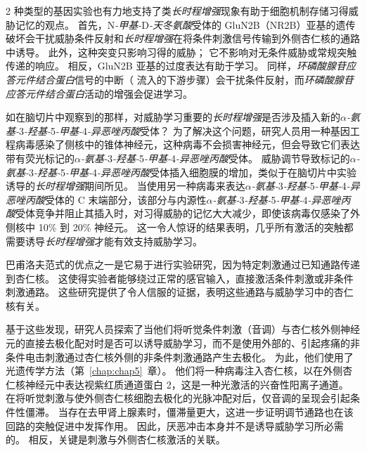 2 种类型的基因实验也有力地支持了类\textit{长时程增强}现象有助于细胞机制存储习得威胁记忆的观点。
首先，N\textit{-甲基-}D\textit{-天冬氨酸}受体的 GluN2B（NR2B）亚基的遗传破坏会干扰威胁条件反射和\textit{长时程增强}在将条件刺激信号传输到外侧杏仁核的通路中诱导。
此外，这种突变只影响习得的威胁；
它不影响对无条件威胁或常规突触传递的响应。
相反，GluN2B 亚基的过度表达有助于学习。
同样，\textit{环磷酸腺苷应答元件结合蛋白}信号的中断（ 流入的下游步骤）会干扰条件反射，而\textit{环磷酸腺苷应答元件结合蛋白}活动的增强会促进学习。


如在脑切片中观察到的那样，对威胁学习重要的\textit{长时程增强}是否涉及插入新的\textit{$\alpha$-氨基-}3\textit{-羟基-}5\textit{-甲基-}4\textit{-异恶唑丙酸}受体？
为了解决这个问题，研究人员用一种基因工程病毒感染了侧核中的锥体神经元，这种病毒不会损害神经元，但会导致它们表达带有荧光标记的\textit{$\alpha$-氨基-}3\textit{-羟基-}5\textit{-甲基-}4\textit{-异恶唑丙酸}受体。
威胁调节导致标记的\textit{$\alpha$-氨基-}3\textit{-羟基-}5\textit{-甲基-}4\textit{-异恶唑丙酸}受体插入细胞膜的增加，类似于在脑切片中实验诱导的\textit{长时程增强}期间所见。
当使用另一种病毒来表达\textit{$\alpha$-氨基-}3\textit{-羟基-}5\textit{-甲基-}4\textit{-异恶唑丙酸}受体的 C 末端部分，该部分与内源性\textit{$\alpha$-氨基-}3\textit{-羟基-}5\textit{-甲基-}4\textit{-异恶唑丙酸}受体竞争并阻止其插入时，对习得威胁的记忆大大减少，即使该病毒仅感染了外侧核中 10\% 到 20\% 神经元。
这一令人惊讶的结果表明，几乎所有激活的突触都需要诱导\textit{长时程增强}才能有效支持威胁学习。


巴甫洛夫范式的优点之一是它易于进行实验研究，因为特定刺激通过已知通路传递到杏仁核。
这使得实验者能够绕过正常的感官输入，直接激活条件刺激或非条件刺激通路。
这些研究提供了令人信服的证据，表明这些通路与威胁学习中的杏仁核有关。


基于这些发现，研究人员探索了当他们将听觉条件刺激（音调）与杏仁核外侧神经元的直接去极化配对时是否可以诱导威胁学习，而不是使用外部的、引起疼痛的非条件电击刺激通过杏仁核外侧的非条件刺激通路产生去极化。
为此，他们使用了光遗传学方法（第~\ref{chap:chap5}~章）。
他们将一种病毒注入杏仁核，以在外侧杏仁核神经元中表达视紫红质通道蛋白 2，这是一种光激活的兴奋性阳离子通道。
在将听觉刺激与使外侧杏仁核细胞去极化的光脉冲配对后，仅音调的呈现会引起条件性僵滞。
当存在去甲肾上腺素时，僵滞量更大，这进一步证明调节通路也在该回路的突触促进中发挥作用。
因此，厌恶冲击本身并不是诱导威胁学习所必需的。
相反，关键是刺激与外侧杏仁核激活的关联。


